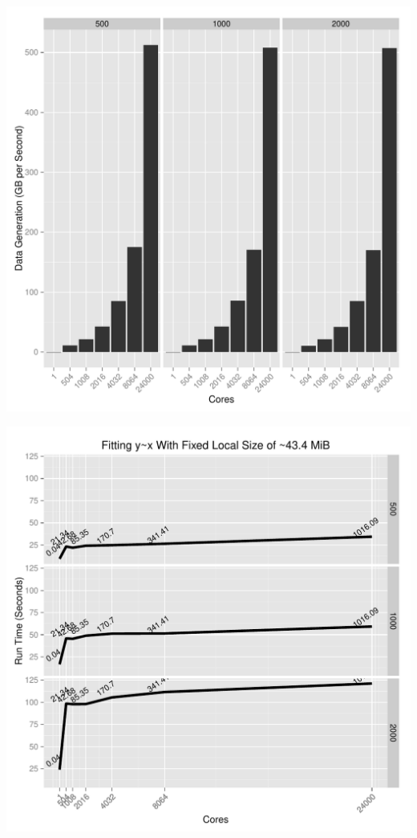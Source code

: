 \begin{frame}
  \begin{block}{}
  \begin{center}
    \includegraphics[height=.88\textheight]{pics/datagen}
  \end{center}
  \end{block}
\end{frame}

\begin{frame}
  \begin{block}{}
  \begin{center}
    \includegraphics[height=.88\textheight]{pics/lmfit1}
  \end{center}
  \end{block}
\end{frame}

